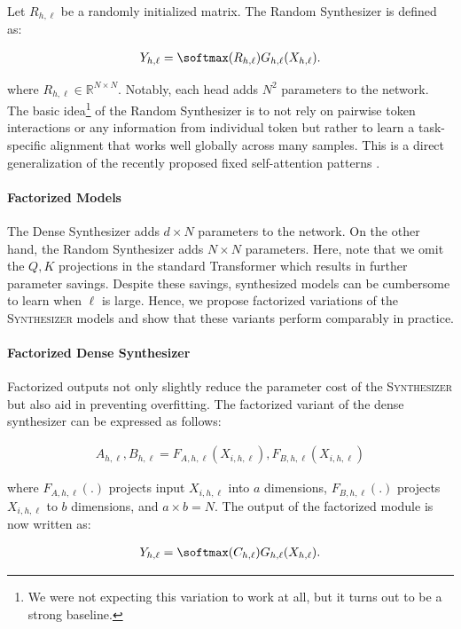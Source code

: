 Let $R_{h,\ell}$ be a randomly initialized matrix. The Random Synthesizer is defined as:

\begin{align}
Y_{h,\ell} = \softmax(R_{h,\ell})G_{h,\ell}(X_{h,\ell}).    
\end{align}

where $R_{h,\ell} \in \mathbb{R}^{N \times N}$. Notably, each head adds $N^2$ parameters to the network. The basic idea\footnote{We were not expecting this variation to work at all, but it turns out to be a strong baseline.} of the Random Synthesizer is to not rely on pairwise token interactions or any information from individual token but rather to learn a task-specific alignment that works well globally across many samples. This is a direct generalization of the recently proposed fixed self-attention patterns \cite{raganato2020fixed}.

\paragraph{Factorized Models} The Dense Synthesizer adds $d \times N$ parameters to the network. On the other hand, the Random Synthesizer adds $N \times N$ parameters. Here, note that we omit the $Q,K$ projections in the standard Transformer which results in further parameter savings. Despite these savings, synthesized models can be cumbersome to learn when $\ell$ is large. Hence, we propose factorized variations of the \textsc{Synthesizer} models and show that these variants perform comparably in practice.
\paragraph{Factorized Dense Synthesizer} Factorized outputs not only slightly reduce the parameter cost of the \textsc{Synthesizer} but also aid in preventing overfitting. The factorized variant of the dense synthesizer can be expressed as follows:

\begin{align}
A_{h,\ell}, B_{h,\ell} = F_{A,h,\ell}(X_{i,h,\ell}), F_{B,h,\ell}(X_{i,h,\ell})    
\end{align}

where $F_{A,h,\ell}(.)$ projects input $X_{i,h,\ell}$ into $a$ dimensions, $F_{B,h,\ell}(.)$ projects $X_{i,h,\ell}$ to $b$ dimensions, and $a \times b=N$. The output of the factorized module is now written as:

\begin{align}
Y_{h,\ell} = \softmax(C_{h,\ell})G_{h,\ell}(X_{h,\ell}).    
\end{align}


